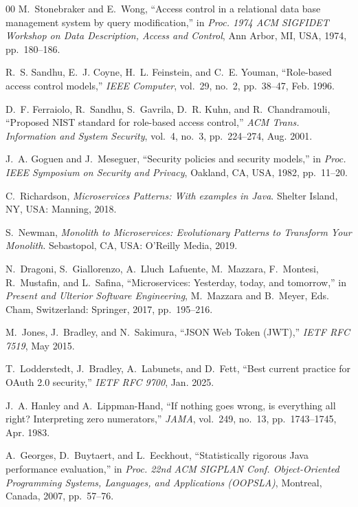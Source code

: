 \documentclass[conference]{IEEEtran}
\begin{document}
\begin{thebibliography}{00}
M.~Stonebraker and E.~Wong, ``Access control in a relational data base management system by query modification,'' in \emph{Proc. 1974 ACM SIGFIDET Workshop on Data Description, Access and Control}, Ann Arbor, MI, USA, 1974, pp.~180--186.

R.~S. Sandhu, E.~J. Coyne, H.~L. Feinstein, and C.~E. Youman, ``Role-based access control models,'' \emph{IEEE Computer}, vol.~29, no.~2, pp.~38--47, Feb. 1996.

D.~F. Ferraiolo, R.~Sandhu, S.~Gavrila, D.~R. Kuhn, and R.~Chandramouli, ``Proposed NIST standard for role-based access control,'' \emph{ACM Trans. Information and System Security}, vol.~4, no.~3, pp.~224--274, Aug. 2001.

J.~A. Goguen and J.~Meseguer, ``Security policies and security models,'' in \emph{Proc. IEEE Symposium on Security and Privacy}, Oakland, CA, USA, 1982, pp.~11--20.

C.~Richardson, \emph{Microservices Patterns: With examples in Java}. Shelter Island, NY, USA: Manning, 2018.

S.~Newman, \emph{Monolith to Microservices: Evolutionary Patterns to Transform Your Monolith}. Sebastopol, CA, USA: O'Reilly Media, 2019.

N.~Dragoni, S.~Giallorenzo, A.~Lluch~Lafuente, M.~Mazzara, F.~Montesi, R.~Mustafin, and L.~Safina, ``Microservices: Yesterday, today, and tomorrow,'' in \emph{Present and Ulterior Software Engineering}, M.~Mazzara and B.~Meyer, Eds. Cham, Switzerland: Springer, 2017, pp.~195--216.

M.~Jones, J.~Bradley, and N.~Sakimura, ``JSON Web Token (JWT),'' \emph{IETF RFC 7519}, May 2015.

T.~Lodderstedt, J.~Bradley, A.~Labunets, and D.~Fett, ``Best current practice for OAuth 2.0 security,'' \emph{IETF RFC 9700}, Jan. 2025.

J.~A. Hanley and A.~Lippman-Hand, ``If nothing goes wrong, is everything all right? Interpreting zero numerators,'' \emph{JAMA}, vol.~249, no.~13, pp.~1743--1745, Apr. 1983.

A.~Georges, D.~Buytaert, and L.~Eeckhout, ``Statistically rigorous Java performance evaluation,'' in \emph{Proc. 22nd ACM SIGPLAN Conf. Object-Oriented Programming Systems, Languages, and Applications (OOPSLA)}, Montreal, Canada, 2007, pp.~57--76.


\end{thebibliography}
\end{document}
